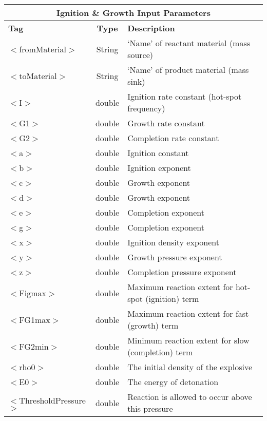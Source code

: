 \begin{center}
\begin{tabular}{| l | c | p{7cm} |}
\hline
  \multicolumn{3}{|c|}{\textbf{Ignition \& Growth Input Parameters}} \\
\hline
\hline
  \textbf{Tag} & \textbf{Type} & \textbf{Description}\\
\hline
  $<$fromMaterial$>$ & String & `Name' of reactant material (mass source)\\
\hline
  $<$toMaterial$>$ & String & `Name' of product material (mass sink)\\
\hline
  $<$I$>$ & double & Ignition rate constant (hot-spot frequency) \\
\hline
  $<$G1$>$ & double & Growth rate constant \\
\hline
  $<$G2$>$ & double & Completion rate constant \\
\hline
  $<$a$>$ & double & Ignition constant \\
\hline
  $<$b$>$ & double & Ignition exponent \\
\hline
  $<$c$>$ & double & Growth exponent \\
\hline
  $<$d$>$ & double & Growth exponent \\
\hline
  $<$e$>$ & double & Completion exponent \\
\hline
  $<$g$>$ & double & Completion exponent \\
\hline
  $<$x$>$ & double & Ignition density exponent \\
\hline
  $<$y$>$ & double & Growth pressure exponent \\
\hline
  $<$z$>$ & double & Completion pressure exponent \\
\hline
  $<$Figmax$>$ & double & Maximum reaction extent for hot-spot (ignition) term \\
\hline
  $<$FG1max$>$ & double & Maximum reaction extent for fast (growth) term \\
\hline
  $<$FG2min$>$ & double & Minimum reaction extent for slow (completion) term \\
\hline
  $<$rho0$>$ & double & The initial density of the explosive \\
\hline
  $<$E0$>$ & double & The energy of detonation \\
\hline
  $<$ThresholdPressure$>$ & double & Reaction is allowed to occur above this pressure \\
\hline
\end{tabular}
\end{center}



